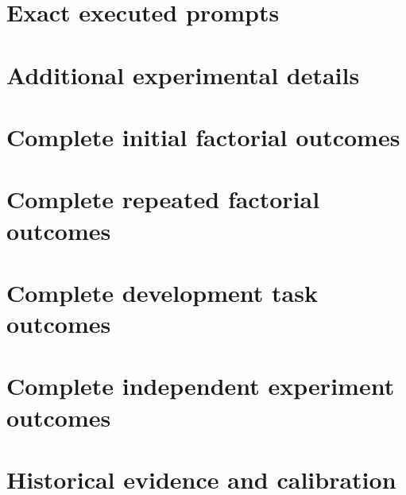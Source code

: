 \section{Exact executed prompts}


\clearpage\section{Additional experimental details}\label{app:experimental-details}

\clearpage\section{Complete initial factorial outcomes}

\clearpage\section{Complete repeated factorial outcomes}

\clearpage\section{Complete development task outcomes}

\clearpage\section{Complete independent experiment outcomes}

\clearpage\section{Historical evidence and calibration}


